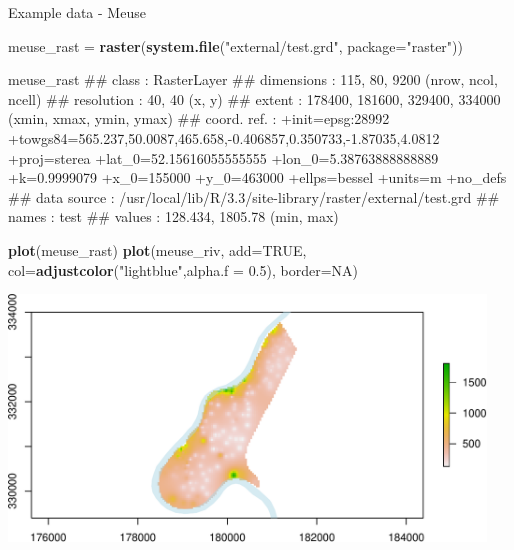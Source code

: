 \documentclass[11pt,ignorenonframetext,]{beamer}
\newenvironment{Shaded}{}{}
\newcommand{\KeywordTok}[1]{\textcolor[rgb]{0.00,0.44,0.13}{\textbf{#1}}}
\newcommand{\DataTypeTok}[1]{\textcolor[rgb]{0.56,0.13,0.00}{#1}}
\newcommand{\FloatTok}[1]{\textcolor[rgb]{0.25,0.63,0.44}{#1}}
\newcommand{\StringTok}[1]{\textcolor[rgb]{0.25,0.44,0.63}{#1}}
\newcommand{\OtherTok}[1]{\textcolor[rgb]{0.00,0.44,0.13}{#1}}
\newcommand{\NormalTok}[1]{#1}
\let\oldShaded\Shaded
\let\endoldShaded\endShaded
\renewenvironment{Shaded}{\footnotesize\begin{spacing}{0.9}\oldShaded}{\endoldShaded\end{spacing}}
\let\oldverbatim\verbatim
\let\endoldverbatim\endverbatim
\newcommand{\scriptoutput}{
  \renewenvironment{Shaded}{\scriptsize\begin{spacing}{0.9}\oldShaded}{\endoldShaded\end{spacing}}
  \renewenvironment{verbatim}{\scriptsize\begin{spacing}{0.9}\oldverbatim}{\endoldverbatim\end{spacing}}
}
\begin{document}
\begin{frame}[fragile,t]{Example data - Meuse}

\scriptoutput

\begin{Shaded}
\begin{Highlighting}[]
\NormalTok{meuse_rast =}\StringTok{ }\KeywordTok{raster}\NormalTok{(}\KeywordTok{system.file}\NormalTok{(}\StringTok{"external/test.grd"}\NormalTok{, }\DataTypeTok{package=}\StringTok{"raster"}\NormalTok{))}

\NormalTok{meuse_rast}
\NormalTok{## class       : RasterLayer }
\NormalTok{## dimensions  : 115, 80, 9200  (nrow, ncol, ncell)}
\NormalTok{## resolution  : 40, 40  (x, y)}
\NormalTok{## extent      : 178400, 181600, 329400, 334000  (xmin, xmax, ymin, ymax)}
\NormalTok{## coord. ref. : +init=epsg:28992 +towgs84=565.237,50.0087,465.658,-0.406857,0.350733,-1.87035,4.0812 +proj=sterea +lat_0=52.15616055555555 +lon_0=5.38763888888889 +k=0.9999079 +x_0=155000 +y_0=463000 +ellps=bessel +units=m +no_defs }
\NormalTok{## data source : /usr/local/lib/R/3.3/site-library/raster/external/test.grd }
\NormalTok{## names       : test }
\NormalTok{## values      : 128.434, 1805.78  (min, max)}
\end{Highlighting}
\end{Shaded}

\end{frame}

\begin{frame}[fragile,t]{}

\scriptoutput

\begin{Shaded}
\begin{Highlighting}[]
\KeywordTok{plot}\NormalTok{(meuse_rast)}
\KeywordTok{plot}\NormalTok{(meuse_riv, }\DataTypeTok{add=}\OtherTok{TRUE}\NormalTok{, }\DataTypeTok{col=}\KeywordTok{adjustcolor}\NormalTok{(}\StringTok{"lightblue"}\NormalTok{,}\DataTypeTok{alpha.f =} \FloatTok{0.5}\NormalTok{), }\DataTypeTok{border=}\OtherTok{NA}\NormalTok{)}
\end{Highlighting}
\end{Shaded}

\begin{center}\includegraphics[width=0.95\textwidth]{Lec17_files/figure-beamer/unnamed-chunk-32-1} \end{center}

\end{frame}
\end{document}
